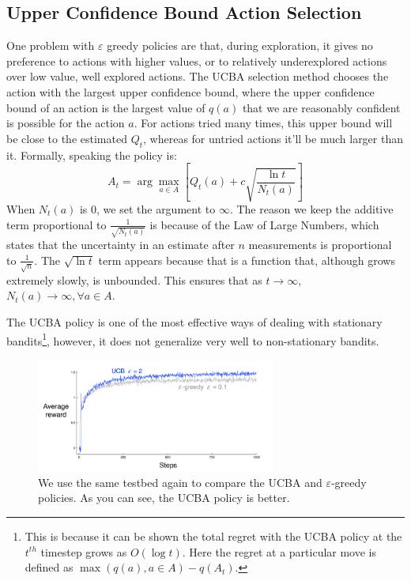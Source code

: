 \documentclass[12pt]{report}
\begin{document}
\subsection{Upper Confidence Bound Action Selection}
One problem with $\varepsilon$ greedy policies are that, during exploration, it gives no preference to actions with higher values, or to relatively underexplored actions over low value, well explored actions.
The UCBA selection method chooses the action with the largest upper confidence bound, where the upper confidence bound of an action is the largest value of $q(a)$ that we are reasonably confident is possible for the action $a$.
For actions tried many times, this upper bound will be close to the estimated $Q_{t}$, whereas for untried actions it'll be much larger than it. Formally, speaking the policy is:
\begin{equation}
    A_{t} = \arg\max_{a \in A}\left[Q_{t}(a) + c\sqrt{\frac{\ln t}{N_{t}(a)}}\right]
\end{equation}
When $N_{t}(a)$ is $0$, we set the argument to $\infty$. The reason we keep the additive term proportional to $\frac{1}{\sqrt{N_{t}(a)}}$ is because of the Law of Large Numbers, 
which states that the uncertainty in an estimate after $n$ measurements is proportional to $\frac{1}{\sqrt{n}}$. The $\sqrt{\ln t}$ term appears because that is a function that, although grows extremely slowly,
is unbounded. This ensures that as $t \rightarrow \infty$, $N_{t}(a) \rightarrow \infty, \forall a \in A$. 

The UCBA policy is one of the most effective ways of dealing with stationary bandits\footnote{This is because it can be shown the total regret with the UCBA policy at the $t^{th}$ timestep grows as $O(\log t)$. Here the regret at a particular move is defined as $\max(q(a), a \in A) - q(A_{t})$.}, however, it does not generalize very well
to non-stationary bandits. 
\begin{figure}[h!]
    \centering
    \includegraphics[width=0.7\textwidth]{images/UCBA.png}
    \caption{We use the same testbed again to compare the UCBA and $\varepsilon$-greedy policies. As you can see, the UCBA policy is better.}
\end{figure}
\end{document}
